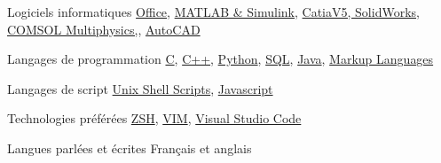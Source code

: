 

\begin{cvskills}

  \cvskill
    {Logiciels informatiques} %
    {\href{https://www.office.com/}{Office},
     \href{https://www.mathworks.com/}{MATLAB \& Simulink},
     \href{https://www.3ds.com/products-services/}{CatiaV5, SolidWorks},
     \href{https://www.comsol.com/}{COMSOL Multiphysics,},
     \href{https://www.autodesk.ca/en/products/autocad/overview}{AutoCAD}
    } %

  \cvskill
    {Langages de programmation} %
    {\href{https://en.cppreference.com/w/c/languagehttps://en.cppreference.com/w/c/language}{C},
     \href{https://en.cppreference.com/w/cpp/language}{C++},
     \href{https://www.python.org/}{Python},
     \href{https://docs.oracle.com/en/database/other-databases/index.html}{SQL},
     \href{https://docs.oracle.com/en/java/index.html}{Java},
     \href{https://techterms.com/definition/markup_language}{Markup Languages}
    } %

  \cvskill
    {Langages de script} %
    {\href{https://www.gnu.org/software/bash/}{Unix Shell Scripts},
     \href{https://developer.oracle.com/ca-en/javascript/}{Javascript}
    }

  \cvskill
    {Technologies préférées} %
    {\href{http://zsh.sourceforge.net/}{ZSH},
     \href{https://www.vim.org/}{VIM},
     \href{https://code.visualstudio.com/}{Visual Studio Code}
    } %

  \cvskill
    {Langues parlées et écrites} %
    {Français et anglais} %

\end{cvskills}
